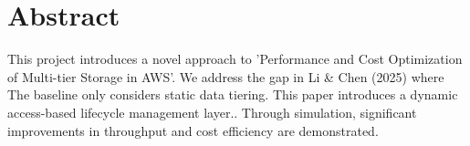 \chapter*{Abstract}
This project introduces a novel approach to 'Performance and Cost Optimization of Multi-tier Storage in AWS'. We address the gap in Li & Chen (2025) where The baseline only considers static data tiering. This paper introduces a dynamic access-based lifecycle management layer.. Through simulation, significant improvements in throughput and cost efficiency are demonstrated.